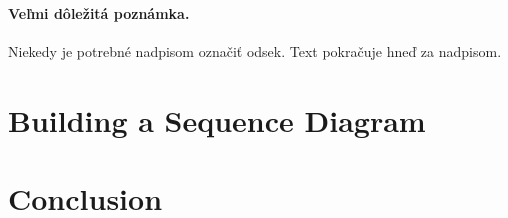 \documentclass[10pt,twoside,slovak,a4paper]{article}
\begin{document}

\paragraph{Veľmi dôležitá poznámka.}
Niekedy je potrebné nadpisom označiť odsek. Text pokračuje hneď za nadpisom.



\section{Building a Sequence Diagram} \label{building}





\section{Conclusion} \label{Conclusion} %







\end{document}
